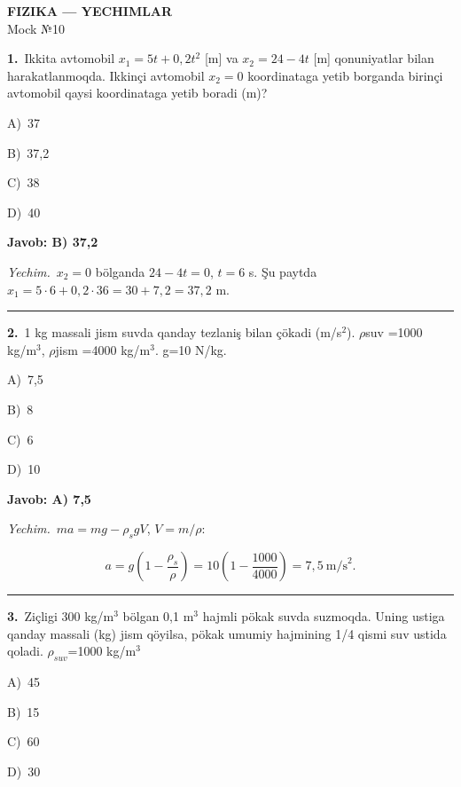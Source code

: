 \documentclass[11pt,a4paper]{article}
\newcommand{\opt}[2]{\hspace*{4mm}#1)\ #2\par}
\begin{document}
\begin{center}{\Large\textbf{FIZIKA — YECHIMLAR}}\\[2pt]{\large Mock №10}\end{center}
\noindent\begin{minipage}{\linewidth}
\textbf{1.}\ Ikkita avtomobil $x_1=5t+0{,}2t^2$ [m] va $x_2=24-4t$ [m] qonuniyatlar bilan harakatlanmoqda. Ikkinçi avtomobil $x_2=0$ koordinataga yetib borganda birinçi avtomobil qaysi koordinataga yetib boradi (m)?\par\smallskip
\opt{A}{37}
\opt{B}{37,2}
\opt{C}{38}
\opt{D}{40}
\end{minipage}\vspace{2pt}\par
\noindent\colorbox{gray!12}{\parbox{\dimexpr\linewidth-2\fboxsep}{\textbf{Javob: B) 37,2}}}\par\smallskip
\noindent\textit{Yechim.}\ $x_2=0$ bölganda $24-4t=0$, $t=6$ s. Şu paytda $x_1=5\cdot6+0{,}2\cdot36=30+7{,}2=37{,}2$ m.\par\par\medskip\hrule\medskip
{}\noindent\begin{minipage}{\linewidth}
\textbf{2.}\ 1 kg massali jism suvda qanday tezlaniş bilan çökadi (m/s$^{2}$). $\rho$suv =1000 kg/m$^{3}$, $\rho$jism =4000 kg/m$^{3}$. g=10 N/kg.\par\smallskip
\opt{A}{7,5}
\opt{B}{8}
\opt{C}{6}
\opt{D}{10}
\end{minipage}\vspace{2pt}\par
\noindent\colorbox{gray!12}{\parbox{\dimexpr\linewidth-2\fboxsep}{\textbf{Javob: A) 7,5}}}\par\smallskip
\noindent\textit{Yechim.}\ $ma=mg-\rho_s gV$, $V=m/\rho$:\par
\[a=g\left(1-\frac{\rho_s}{\rho}\right)=10\left(1-\frac{1000}{4000}\right)=7{,}5\ \text{m/s}^2.\]\par\medskip\hrule\medskip
{}\noindent\begin{minipage}{\linewidth}
\textbf{3.}\ Ziçligi 300 kg/m$^{3}$ bölgan 0,1 m$^{3}$ hajmli pökak suvda suzmoqda. Uning ustiga qanday massali (kg) jism qöyilsa, pökak umumiy hajmining 1/4 qismi suv ustida qoladi. $\rho_{suv}$=1000 kg/m$^{3}$\par\smallskip
\opt{A}{45}
\opt{B}{15}
\opt{C}{60}
\opt{D}{30}
\end{minipage}\vspace{2pt}\par
\end{document}
